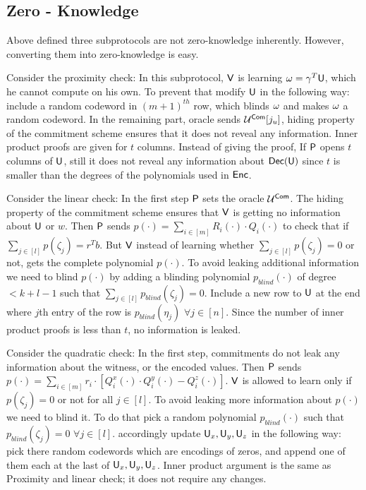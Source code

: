 \subsection{Zero - Knowledge}\label{subsec:zeroknowledge}
Above defined three subprotocols are not zero-knowledge inherently. However, converting them into zero-knowledge is easy. 

Consider the proximity check: In this subprotocol, $\mathsf{V}$ is learning $\omega = \gamma^T\mathsf{U}$, which he cannot compute on his own. To prevent that modify $\mathsf{U}$ in the following way: include a random codeword in $(m+1)^{th}$ row, which blinds $\omega$ and makes $\omega$ a random codeword. 
In the remaining part, oracle sends $\mathcal{U}^{\mathsf{Com}}[j_u]$, hiding property of the commitment scheme ensures that it does not reveal any information.
Inner product proofs are given for $t$ columns. Instead of giving the proof, If $\mathsf{P}$ opens $t$ columns of $\mathsf{U}$, still it does not reveal any information about $\mathsf{Dec}(\mathsf{U})$ since $t$ is smaller than the degrees of the polynomials used in $\mathsf{Enc}$.

Consider the linear check: In the first step $\mathsf{P}$ sets the oracle $\mathcal{U}^{\mathsf{Com}}$. The hiding property of the commitment scheme ensures that $\mathsf{V}$ is getting no information about $\mathsf{U}$ or $w$.
Then $\mathsf{P}$ sends $p(\cdot) = \sum_{i\in[m]} R_i (\cdot) \cdot Q_i(\cdot)$ to check that if $\sum_{j\in [l]} p(\zeta_j) = r^Tb$. But $\mathsf{V}$ instead of learning whether $\sum_{j\in[l]} p(\zeta_j) = 0$ or not, gets the complete polynomial $p(\cdot)$. To avoid leaking additional information we need to blind $p(\cdot)$ by adding a blinding polynomial $p_{blind}(\cdot)$ of degree $< k + l - 1$ such that $\sum_{j\in[l]} p_{blind}(\zeta_j) = 0$. Include a new row to $\mathsf{U}$ at the end where $j$th entry of the row is $p_{blind}(\eta_j)$ $\forall j\in [n]$.
Since the number of inner product proofs is less than $t$, no information is leaked.

Consider the quadratic check: In the first step, commitments do not leak any information about the witness, or the encoded values.
Then $\mathsf{P}$ sends $p(\cdot) = \sum_{i\in[m]} r_i\cdot [Q^x_i(\cdot)\cdot Q^y_i(\cdot) - Q^z_i(\cdot)]$. $\mathsf{V}$ is allowed to learn only if $p(\zeta_j)=0$ or not for all $j\in[l]$. To avoid leaking more information about $p(\cdot)$ we need to blind it. To do that pick a random polynomial $p_{blind}(\cdot)$ such that $p_{blind}(\zeta_j) = 0$ $\forall j\in [l]$. accordingly update $\mathsf{U}_x, \mathsf{U}_y,\mathsf{U}_z$ in the following way: pick there random codewords which are encodings of zeros, and append one of them each at the last of $\mathsf{U}_{x}, \mathsf{U}_{y}, \mathsf{U}_{z}$.
Inner product argument is the same as Proximity and linear check; it does not require any changes. 

